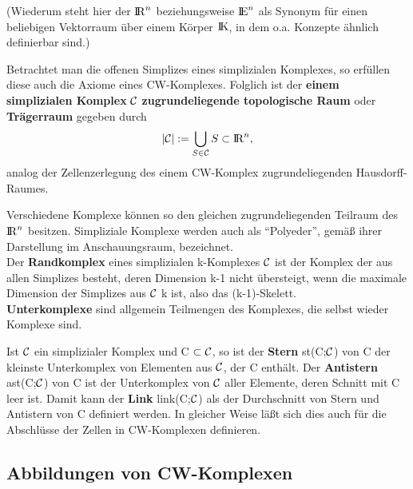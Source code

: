 (Wiederum steht hier der $\mbox{$\rm I\!R$}^n$ beziehungsweise $\mbox{$\rm I\!E$}^n$ als Synonym für einen
beliebigen Vektorraum über einem Körper $\mbox{$\rm I\!K$}$, in dem o.a. Konzepte ähnlich
definierbar sind.)

Betrachtet man die offenen Simplizes eines simplizialen Komplexes, so
erfüllen diese auch die Axiome eines CW-Komplexes. Folglich ist der {\bf einem
simplizialen Komplex} $\cal C$ {\bf zugrundeliegende topologische Raum}
 oder {\bf Trägerraum}
 gegeben durch
$$|{\cal C}| := \bigcup\limits_{S\in{\cal C}} S \subset \mbox{$\rm I\!R$}^n,$$
analog der Zellenzerlegung des einem CW-Komplex zugrundeliegenden
Hausdorff-Raumes.

Verschiedene Komplexe können so den gleichen zugrundeliegenden Teilraum des
$\mbox{$\rm I\!R$}^n$ besitzen. Simpliziale Komplexe werden auch als "`Polyeder"', gemäß
ihrer Darstellung im Anschauungsraum, bezeichnet.\\
Der {\bf Randkomplex} eines simplizialen k-Komplexes $\cal C$ ist der Komplex
der aus allen Simplizes besteht, deren Dimension k-1 nicht übersteigt, wenn
die maximale Dimension der Simplizes aus $\cal C$ k ist, also das
(k-1)-Skelett.\\
{\bf Unterkomplexe} sind allgemein Teilmengen des Komplexes, die
selbst wieder Komplexe sind.

Ist $\cal C$ ein simplizialer Komplex und C $\subset\cal C$, so ist der
{\bf Stern} st(C;$\cal C$) von C der kleinste
Unterkomplex von Elementen aus $\cal C$, der C enthält. Der {\bf Antistern}
 ast(C;$\cal C$) von C ist der
Unterkomplex von $\cal C$ aller Elemente, deren Schnitt mit C leer ist. Damit
kann der {\bf Link}
link(C;$\cal C$) als der Durchschnitt von Stern und Antistern von C definiert
werden. In gleicher Weise läßt sich dies auch für die Abschlüsse der Zellen
in CW-Komplexen definieren.

\subsection{Abbildungen von CW-Komplexen}

